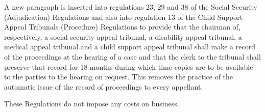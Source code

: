 \documentclass[a4paper]{article}
\begin{document}
  A new paragraph is inserted into regulations 23, 29 and 38 of the Social Security (Adjudication) Regulations and also into regulation 13 of the Child Support Appeal Tribunals (Procedure) Regulations to provide that the chairman of, respectively, a social security appeal tribunal, a disability appeal tribunal, a medical appeal tribunal and a child support appeal tribunal shall make a record of the proceedings at the hearing of a case and that the clerk to the tribunal shall preserve that record for 18 months during which time copies are to be available to the parties to the hearing on request. This removes the practice of the automatic issue of the record of proceedings to every appellant.

  These Regulations do not impose any costs on business.
\end{document}
